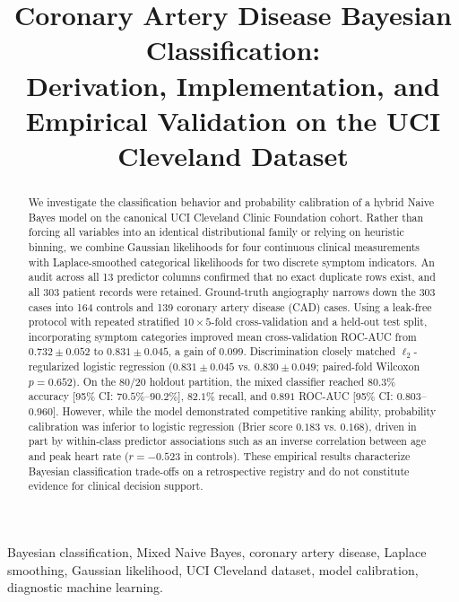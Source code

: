\documentclass[conference]{IEEEtran}
\begin{document}
\title{Coronary Artery Disease Bayesian Classification:\\
Derivation, Implementation, and Empirical Validation on the UCI Cleveland Dataset}

\author{}

\maketitle

\begin{abstract}
We investigate the classification behavior and probability calibration of a hybrid Naive Bayes model on the canonical UCI Cleveland Clinic Foundation cohort. Rather than forcing all variables into an identical distributional family or relying on heuristic binning, we combine Gaussian likelihoods for four continuous clinical measurements with Laplace-smoothed categorical likelihoods for two discrete symptom indicators. An audit across all 13 predictor columns confirmed that no exact duplicate rows exist, and all 303 patient records were retained. Ground-truth angiography narrows down the 303 cases into 164 controls and 139 coronary artery disease (CAD) cases. Using a leak-free protocol with repeated stratified $10 \times 5$-fold cross-validation and a held-out test split, incorporating symptom categories improved mean cross-validation ROC-AUC from $0.732\pm0.052$ to $0.831\pm0.045$, a gain of $0.099$. Discrimination closely matched $\ell_2$-regularized logistic regression ($0.831\pm0.045$ vs. $0.830\pm0.049$; paired-fold Wilcoxon $p=0.652$). On the 80/20 holdout partition, the mixed classifier reached $80.3\%$ accuracy [95\% CI: $70.5\%$--$90.2\%$], $82.1\%$ recall, and $0.891$ ROC-AUC [95\% CI: $0.803$--$0.960$]. However, while the model demonstrated competitive ranking ability, probability calibration was inferior to logistic regression (Brier score $0.183$ vs. $0.168$), driven in part by within-class predictor associations such as an inverse correlation between age and peak heart rate ($r=-0.523$ in controls). These empirical results characterize Bayesian classification trade-offs on a retrospective registry and do not constitute evidence for clinical decision support.
\end{abstract}

\begin{IEEEkeywords}
Bayesian classification, Mixed Naive Bayes, coronary artery disease, Laplace smoothing, Gaussian likelihood, UCI Cleveland dataset, model calibration, diagnostic machine learning.
\end{IEEEkeywords}
\end{document}
